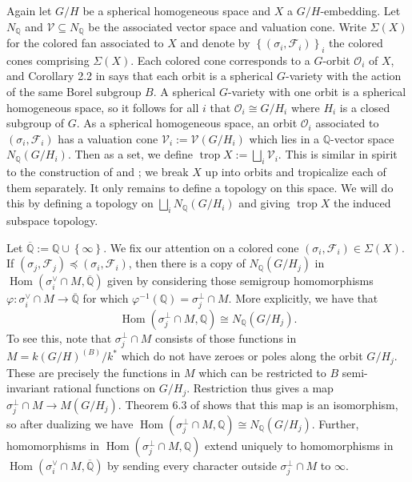 \documentclass[12pt,twoside,cd]{amsart}
\theoremstyle{definition}
\begin{document}
Again let $G/H$ be a spherical homogeneous space and $X$ a $G/H$-embedding.
Let $N_\mathbb{Q}$ and $\mathcal{V} \subseteq N_\mathbb{Q}$ be the associated vector space and valuation cone. Write $\Sigma(X)$ for the colored fan associated to $X$ and denote by ${\left\lbrace {(\sigma_i,\mathcal{F}_i)} \right\rbrace}_i$ the colored cones comprising $\Sigma(X)$.
Each colored cone corresponds to a $G$-orbit $\mathcal{O}_i$ of $X$, and Corollary 2.2 in \cite{Kn} says that each orbit is a spherical $G$-variety with the action of the same Borel subgroup $B$.
A spherical $G$-variety with one orbit is a spherical homogeneous space, so it follows for all $i$ that $\mathcal{O}_i \cong G/H_i$ where $H_i$ is a closed subgroup of $G$.
As a spherical homogeneous space, an orbit $\mathcal{O}_i$ associated to $(\sigma_i,\mathcal{F}_i)$ has a valuation cone $\mathcal{V}_i := \mathcal{V}(G/H_i)$ which lies in a $\mathbb{Q}$-vector space $N_\mathbb{Q}(G/H_i)$.
Then as a set, we define ${\operatorname{trop}}{X} := \bigsqcup_i \mathcal{V}_i$.
This is similar in spirit to the construction of \cite{Ka} and \cite{Pay}; we break $X$ up into orbits and tropicalize each of them separately.
It only remains to define a topology on this space.
We will do this by defining a topology on $\bigsqcup_i N_\mathbb{Q}(G/H_i)$ and giving ${\operatorname{trop}}{X}$ the induced subspace topology.

Let $\overline{\mathbb{Q}} := \mathbb{Q} \cup {\left\lbrace {\infty} \right\rbrace}$. We fix our attention on a colored cone $(\sigma_i,\mathcal{F}_i) \in \Sigma(X)$.
If $(\sigma_j,\mathcal{F}_j) \preceq (\sigma_i,\mathcal{F}_i)$, then there is a copy of $N_\mathbb{Q}(G/H_j)$ in ${\operatorname{Hom}}{(\sigma_i^\vee \cap M, \overline{\mathbb{Q}})}$ given by considering those semigroup homomorphisms $\varphi: \sigma_i^\vee \cap M \rightarrow \overline{\mathbb{Q}}$ for which $\varphi^{-1}(\mathbb{Q}) = \sigma_j^\perp \cap M$.
More explicitly, we have that 
\[
{\operatorname{Hom}}{(\sigma_j^\perp \cap M,\mathbb{Q})} \cong N_\mathbb{Q}(G/H_j).
\]
To see this, note that $\sigma_j^\perp \cap M$ consists of those functions in $M = k(G/H)^{(B)}/k^\ast$ which do not have zeroes or poles along the orbit $G/H_j$.
These are precisely the functions in $M$ which can be restricted to $B$ semi-invariant rational functions on $G/H_j$.
Restriction thus gives a map $\sigma_j^\perp \cap M \rightarrow M(G/H_j)$.
Theorem 6.3 of \cite{Kn} shows that this map is an isomorphism, so after dualizing we have ${\operatorname{Hom}}{(\sigma_j^\perp \cap M,\mathbb{Q})} \cong N_\mathbb{Q}(G/H_j)$.
Further, homomorphisms in ${\operatorname{Hom}}{(\sigma_j^\perp \cap M,\mathbb{Q})}$ extend uniquely to homomorphisms in ${\operatorname{Hom}}{(\sigma_i^\vee \cap M,\overline{\mathbb{Q}})}$ by sending every character outside $\sigma_j^\perp \cap M$ to $\infty$.
\end{document}
